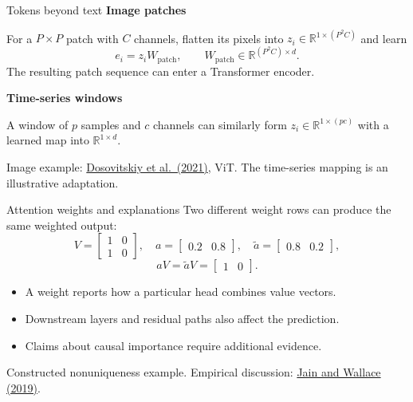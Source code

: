 \documentclass[aspectratio=169,11pt]{beamer}
\newcommand{\R}{\mathbb{R}}
\newcommand{\lead}[1]{{\color{ink}\bfseries #1}\par\vspace{1.2mm}}
\newcommand{\src}[1]{\par\vfill{\fontsize{7}{8.5}\selectfont\color{muted}#1}\par}
\begin{document}
\begin{frame}[t]{Tokens beyond text}
\lead{Image patches}
For a $P\times P$ patch with $C$ channels, flatten its pixels into
$z_i\in\R^{1\times(P^2C)}$ and learn
\[
 e_i=z_iW_{\mathrm{patch}},\qquad
 W_{\mathrm{patch}}\in\R^{(P^2C)\times d}.
\]
The resulting patch sequence can enter a Transformer encoder.
\par\vspace{2mm}
\lead{Time-series windows}
A window of $p$ samples and $c$ channels can similarly form
$z_i\in\R^{1\times(pc)}$ with a learned map into $\R^{1\times d}$.
\src{Image example: \href{https://arxiv.org/abs/2010.11929}{Dosovitskiy et al.\ (2021)}, ViT. The time-series mapping is an illustrative adaptation.}
\end{frame}

\begin{frame}[t]{Attention weights and explanations}
Two different weight rows can produce the same weighted output:
\[
 V=\begin{bmatrix}1&0\\1&0\end{bmatrix},\quad
 a=\begin{bmatrix}0.2&0.8\end{bmatrix},\quad
 \widetilde a=\begin{bmatrix}0.8&0.2\end{bmatrix},
\]
\[aV=\widetilde aV=\begin{bmatrix}1&0\end{bmatrix}.\]
\begin{itemize}
  \item A weight reports how a particular head combines value vectors.
  \item Downstream layers and residual paths also affect the prediction.
  \item Claims about causal importance require additional evidence.
\end{itemize}
\src{Constructed nonuniqueness example. Empirical discussion: \href{https://arxiv.org/abs/1902.10186}{Jain and Wallace (2019)}.}
\end{frame}
\end{document}
